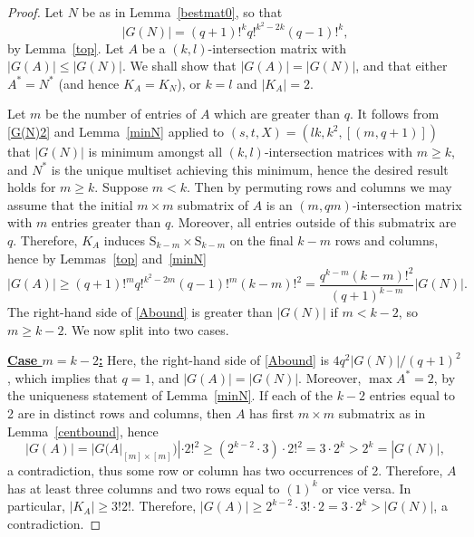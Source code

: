 \documentclass{daj}
\renewcommand\S{\mathrm{S}}
\theoremstyle{plain}
\theoremstyle{definition}
\begin{document}
\begin{proof}
Let $N$ be as in Lemma~\ref{bestmat0}, so that \begin{equation}\label{G(N)2}|G(N)|=(q+1)!^kq!^{k^2-2k}(q-1)!^k,\end{equation} by Lemma~\ref{top}. Let $A$ be a $(k,l)$-intersection matrix with $|G(A)|\leq |G(N)|$.  We shall show that $|G(A)|=|G(N)|$, and that either $A^*=N^*$ (and hence $K_A=K_N$), or $k=l$ and $|K_A|=2$.

Let $m$ be the number of entries of $A$ which are greater than $q$. It follows from \eqref{G(N)2} and Lemma~\ref{minN} applied to $(s,t,X)=(lk,k^2,[(m,q+1)])$ that $|G(N)|$ is minimum amongst all $(k,l)$-intersection matrices with $m\geq k$, and $N^*$ is the unique multiset achieving this minimum, hence the desired result holds for $m\geq k$. Suppose $m<k$. Then by permuting rows and columns we may assume that the initial $m\times m$ submatrix of $A$ is an $(m,qm)$-intersection matrix with $m$ entries greater than $q$. Moreover, all entries outside of this submatrix are $q$. Therefore, $K_A$ induces $\S_{k-m}\times \S_{k-m}$ on the final $k-m$ rows and columns, hence by Lemmas~\ref{top} and~\ref{minN} \begin{equation}\label{Abound}|G(A)|\geq (q+1)!^mq!^{k^2-2m}(q-1)!^m(k-m)!^2=\frac{q^{k-m}(k-m)!^2}{(q+1)^{k-m}}|G(N)|.\end{equation} The right-hand side of \eqref{Abound} is greater than $|G(N)|$ if $m<k-2$, so $m\geq k-2$. We now split into two cases.

\vspace{11pt}\noindent \textbf{\underline{Case $m=k-2$:}} Here, the right-hand side of \eqref{Abound} is $4q^2|G(N)|/(q+1)^2$, which implies that $q=1$, and $|G(A)|=|G(N)|$. Moreover, $\max A^*=2$, by the uniqueness statement of Lemma~\ref{minN}. If each of the $k-2$ entries equal to 2 are in distinct rows and columns, then $A$ has first $m\times m$ submatrix as in Lemma~\ref{centbound}, hence $$|G(A)|=|G(A|_{[m]\times [m]})|\cdot 2!^2\geq (2^{k-2}\cdot3)\cdot2!^2=3\cdot2^{k}>2^k=|G(N)|,$$ a contradiction, thus some row or column has two occurrences of 2. 
Therefore, $A$ has at least three columns and two rows equal to $(1)^k$ or vice versa. In particular, $|K_A|\geq 3!2!$. Therefore, $|G(A)|\geq 2^{k-2}\cdot3!\cdot2= 3\cdot2^{k}>|G(N)|$, a contradiction.


\end{proof}
\end{document}
